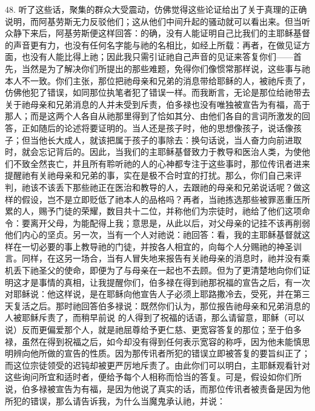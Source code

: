 48. 听了这些话，聚集的群众大受震动，仿佛觉得这些论证给出了关于真理的正确说明，而阿基劳斯无力反驳他们；这从他们中间升起的骚动就可以看出来。但当听众静下来后，阿基劳斯便这样回答：的确，没有人能证明自己比我们的主耶稣基督的声音更有力，也没有任何名字能与祂的名相比，如经上所载：再者，在做见证方面，也没有人能比得上祂；因此我只需引证祂自己声音的见证来答复你们——首先，当然是为了解决你们所提出的那些难题，免得你们像惯常那样说，这些事与祂本人不一致。你们主张，那位把祂母亲和兄弟的消息带给耶稣的人，被祂斥责了，仿佛他犯了错误，如同那位执笔者犯了错误一样。而我断言，无论是那位给祂带去关于祂母亲和兄弟消息的人并未受到斥责，伯多禄也没有唯独被宣告为有福，高于那人；而是这两个人各自从祂那里得到了恰如其分、由他们各自的言词所激发的回答，正如随后的论述将要证明的。当人还是孩子时，他的思想像孩子，说话像孩子；但当他长大成人，就该把属于孩子的事除去：换句话说，当人奋力向前进取时，就会忘记背后的。因此，当我们的主耶稣基督致力于教导和医治人类，为使他们不致全然丧亡，并且所有聆听祂的人的心神都专注于这些事时，那位传讯者进来提醒祂有关祂母亲和兄弟的事，实在是极不合时宜的打扰。那么，你们自己来评判，祂该不该丢下那些祂正在医治和教导的人，去跟祂的母亲和兄弟说话呢？做这样的假设，岂不是立即贬低了祂本人的品格吗？再者，当祂拣选那些被罪恶重压所累的人，赐予门徒的荣耀，数目共十二位，并称他们为宗徒时，祂给了他们这项命令：要离开父母，为能配得上我；意思是，从此以后，对父母亲的记挂不该再削弱他们内心的坚贞。另一次，当有一个人对祂说：祂回答：看，我的主耶稣基督就这样在一切必要的事上教导祂的门徒，并按各人相宜的，向每个人分赐祂的神圣训言。同样，在这另一场合，当有人冒失地来报告有关祂母亲的消息时，祂并没有乘机丢下祂圣父的使命，即便为了与母亲在一起也不去顾。但为了更清楚地向你们证明这才是事情的真相，让我提醒你们，伯多禄在得到祂那祝福的宣告之后，有一次对耶稣说：他这样说，是在耶稣向他宣告人子必须上耶路撒冷去，受死，并在第三天复活之后。那时祂回答伯多禄说：既然你们认为，那位报告祂母亲和兄弟消息的人被耶稣斥责了，而稍早前说  的人得到了祝福的话语，那么请留意，耶稣（可以说）反而更偏爱那个人，就是祂屈尊给予更仁慈、更宽容答复的那位；至于伯多禄，虽然在得到祝福之后，如今却没有得到任何表示宽容的称呼，因为他未能慎思明辨向他所做的宣告的性质。因为那传讯者所犯的错误立即被答复的要旨纠正了；而这位宗徒领受的迟钝却被更严厉地斥责了。由此你们可以明白，主耶稣观看针对这些询问所宜和适时者，便给予每个人相称而恰当的答复。可是，假设如你们所说，伯多禄被宣告为有福，是因为他说了真实的话，而那位传讯者被责备是因为他所犯的错误，那么请告诉我，为什么当魔鬼承认祂，并说： 